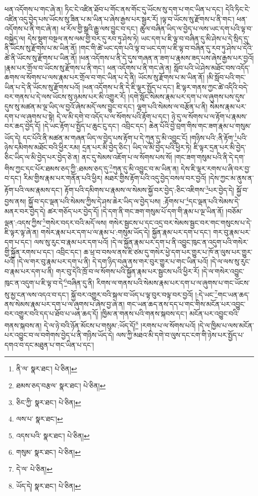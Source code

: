 ཕན་འདོགས་པ་གང་ཞེ་ན། ཏིང་ངེ་འཛིན་ཐོབ་པ་གོང་ནས་གོང་དུ་ཡོངས་སུ་དག་པ་གང་ཡིན་པ་དང་། དེའི་ཏིང་ངེ་འཛིན་འདུ་བྱེད་པས་ཡོངས་སུ་ཟིན་པ་མ་ཡིན་པ་ཞེས་རྒྱས་པར་སྦྱར་རོ། །ལྟ་བ་ཡོངས་སུ་རྫོགས་པ་ནི་གང་། ཕན་འདོགས་པ་ནི་གང་ཞེ་ན། ཕ་རོལ་གྱི་སྒྲའི་རྒྱུ་ལས་བྱུང་བ་དང་། ཚུལ་བཞིན་ཡིད་ལ་བྱེད་པ་ལས་ཡང་དག་པའི་ལྟ་བ་བསྐྱེད་ལ། དེས་སྡུག་བསྔལ་ནས་ལམ་གྱི་བར་དུ་རབ་ཏུ་ཤེས་ཏེ། ཡང་དག་པ་ཇི་ལྟ་བ་བཞིན་དུ་མི་ཤེས་པ་དེ་སྲིད་དུ་ནི་ཡོངས་སུ་རྫོགས་པ་མ་ཡིན་ནོ། །གང་གི་ཚེ་ཡང་དག་པའི་ལྟ་བ་ཡང་དག་པ་ཇི་ལྟ་བ་བཞིན་དུ་རབ་ཏུ་ཤེས་པ་དེའི་ཚེ་ནི་ཡོངས་སུ་རྫོགས་པ་ཡིན་ནོ། །ཕན་འདོགས་པ་ནི་དེ་དུས་གཞན་ན་ཟག་པ་རྣམས་ཟད་པས་ཞེས་རྒྱས་པར་བྱའོ། །རྣམ་པར་གྲོལ་བ་ཡོངས་སུ་རྫོགས་པ་ནི་གང་། ཕན་འདོགས་པ་ནི་གང་ཞེ་ན། སློབ་པའི་ཡེ་ཤེས་མཐོང་བས་འདོད་ཆགས་ལ་སོགས་པ་ལས་རྣམ་པར་གྲོལ་བ་གང་ཡིན་པ་དེ་ནི། ཡོངས་སུ་རྫོགས་པ་མ་ཡིན་ནོ། །མི་སློབ་པའི་གང་ཡིན་པ་དེ་ནི་ཡོངས་སུ་རྫོགས་པའོ། །ཕན་འདོགས་པ་ནི་དེ་ཇི་ལྟར་སྤྱོད་པ་དང་། ཇི་ལྟར་གནས་ཀྱང་ཚེ་འདིའི་བདེ་བར་གནས་པ་དེ་ལས་ཡོངས་སུ་ཉམས་པར་མི་འགྱུར་རོ། །དགེ་སློང་སེམས་རྣམ་པར་དག་པ་ལ་ཞུགས་པས་དུས་དུས་སུ་མཚན་མ་ལྔ་ཡིད་ལ་བྱའོ་ཞེས་མདོ་ལས་བྱུང་བ་དང་། ལྷག་པའི་སེམས་ལ་བརྩོན་པ་ནི། སེམས་རྣམ་པར་དག་པ་ལ་ཞུགས་པ་སྟེ། དེ་ལ་མི་དགེ་བ་འདོད་པ་ལ་སོགས་པའི་རྟོག་པ་དང་། ཉེ་དུ་ལ་སོགས་པ་ལ་རྟོག་པ་རྣམས་བར་ཆད་བྱེད་དོ། །དེ་ཡང་རྟོག་པ་སྤྱོད་པ་ཆུང་ངུ་དང་། འབྲིང་དང་། ཆེན་པོའི་བྱེ་བྲག་གིས་གང་ཟག་རྣམ་པ་གསུམ་ཡོད་དེ། དང་པོའི་ནི་མཚན་མ་གཞན་ཡིད་ལ་བྱེད་པས་རྟོག་པ་དེ་ཀུན་དུ་མི་འབྱུང་ངོ། །གཉིས་པའི་:ནི་རྟོག་\footnote{ནི་ལ་  སྣར་ཐང་།  པེ་ཅིན། }པའི་ཉེས་དམིགས་མཐོང་བའི་ཕྱིར་རམ། དྲན་པར་མི་བྱེད་ཅིང་། ཡིད་ལ་མི་བྱེད་པའི་ཕྱིར་ཏེ། ཇི་ལྟར་དྲན་པར་མི་བྱེད་ཅིང་ཡིད་ལ་མི་བྱེད་པར་བྱེད་ཅེ་ན། ནང་དུ་སེམས་འཇོག་པ་ལ་སོགས་པས་སོ། །གང་ཟག་གསུམ་པའི་ནི་དེ་དག་གིས་ཀྱང་དང་པོར་ཐམས་ཅད་ཀྱི་:ཐམས་ཅད་དུ་\footnote{ཐམས་ཅད་བརྩལ་  སྣར་ཐང་།  པེ་ཅིན། }ཀུན་དུ་མི་འབྱུང་བ་མ་ཡིན་ན། དེས་ཇི་ལྟར་རགས་པ་ཞི་བར་བྱ་བ་དང་། རིམ་གྱིས་རྣམ་པར་གནོན་པའི་ཕྱིར། མཐར་གྱིས་རྟོག་པའི་འདུ་བྱེད་བསལ་བར་བྱའོ། །དེས་ཀྱང་མ་ནུས་ན་རྟོག་པའི་ལམ་རྣམས་དང་། རྟོག་པའི་དམིགས་པ་རྣམས་ལ་སེམས་སྐྱོ་བར་བྱེད་:ཅིང་འཇིགས་\footnote{ཅིང་ཀྱི་  སྣར་ཐང་།  པེ་ཅིན། }པར་བྱེད་དེ། སྐྱོ་བ་བྱས་ནས། སྐྱོ་བ་དང་ལྡན་པའི་སེམས་ཀྱིས་དེ་ཤས་ཆེར་ཡིད་ལ་བྱེད་པས། :རྟོགས་པ་\footnote{ལས་པ་  སྣར་ཐང་། }དང་ལྡན་པའི་སེམས་དེ་མནར་བར་བྱེད་དེ། ཚར་གཅོད་པར་བྱེད་དོ། །དེ་དག་ནི་གང་ཟག་གསུམ་པོ་དག་གི་རྣམ་པ་ལྔ་ཡིན་ནོ། །བཅོམ་ལྡན་:འདས་ཀྱིས་\footnote{འདས་པའི་  སྣར་ཐང་།  པེ་ཅིན། }གསེར་བདར་བའི་མདོ་ལས། གསེར་སྦྱངས་པ་དང་འདྲ་བར་སེམས་སྦྱང་བར་གང་གསུངས་པ་དེ་ཇི་ལྟར་ལྟ་ཞེ་ན། གསེར་རྣམ་པར་དག་པ་ལ་རྣམ་པ་:གསུམ་ཡོད་དེ། སྐྱོན་རྣམ་པར་དག་པ་དང་། གར་བུ་རྣམ་པར་དག་པ་དང་། ལས་སུ་རུང་བ་རྣམ་པར་དག་པའོ། །དེ་ལ་སྐྱོན་རྣམ་པར་དག་པ་ནི་འབྱུང་ཁུང་ན་འདུག་པའི་གསེར་གྱི་སྐྱོན་རགས་པ་དང་། འབྲིང་དང་། ཆ་ཕྲ་བ་བསལ་ནས་ཇི་ཙམ་དུ་གསེར་ཕྱེ་དག་པར་གྱུར་པ་ཁོ་ན་ལུས་པར་གྱུར་པའོ། །དེ་ལ་གར་བུ་རྣམ་པར་དག་པ་ནི། དེ་དག་ཉིད་བཞུ་ནས་གར་བུར་གྱུར་པ་གང་ཡིན་པའོ། །དེ་ལ་ལས་སུ་རུང་བ་རྣམ་པར་དག་པ་ནི། གར་བུ་དེའི་ཁྲོ་བ་ལ་སོགས་པའི་སྐྱོན་རྣམ་པར་སྦྱངས་པའི་ཕྱིར་རོ། །དེ་ལ་གསེར་འབྱུང་ཁུང་ན་འདུག་པ་ཇི་ལྟ་བ་དེ་\footnote{གསུམ་  སྣར་ཐང་།  པེ་ཅིན། }བཞིན་དུ་ནི། རིགས་ལ་གནས་པའི་སེམས་རྣམ་པར་དག་པ་ལ་ཞུགས་པ་གང་ཡོངས་སུ་མྱ་ངན་ལས་འདའ་བ་དང་། སྐྱོ་བར་འགྱུར་བའི་སྐལ་བ་ཡོད་པ་ལྟ་བུར་བལྟ་བར་བྱའོ། །:དེ་ཡང་\footnote{དེ་ལ་  པེ་ཅིན། }གང་ཡན་ཆད་ནས་སེམས་རྣམ་པར་དག་པ་ལ་ཞུགས་པ་ཞེས་བྱ་ཞེ་ན། གང་ཡན་ཆད་ནས་དད་པ་གང་གིས་མངོན་པར་འབྱུང་བར་འགྱུར་བའི་དད་པ་ཐོབ་པ་ཡན་ཆད་དོ། །ཁྱིམ་ན་གནས་པའི་གནས་སྐབས་དང་། མངོན་པར་འབྱུང་བའི་གནས་སྐབས་ན། དེ་ལ་ཉེ་བའི་ཉོན་མོངས་པ་གསུམ་:ཡོད་དོ།\footnote{ཡོད་དེ།  སྣར་ཐང་།  པེ་ཅིན། } །རགས་པ་ལ་སོགས་པའོ། །དེ་ལ་ཁྱིམ་པ་ལས་མངོན་པར་འབྱུང་བ་ལ་བགེགས་བྱེད་པ་ནི་གཉིས་ཡོད་དེ། ལས་ཀྱི་མཐའ་མི་དགེ་བ་ལུས་དང་ངག་གི་ཉེས་པར་སྤྱོད་པ་དགའ་བ་དང་མཐུན་པ་གང་ཡིན་པ་དང་། 